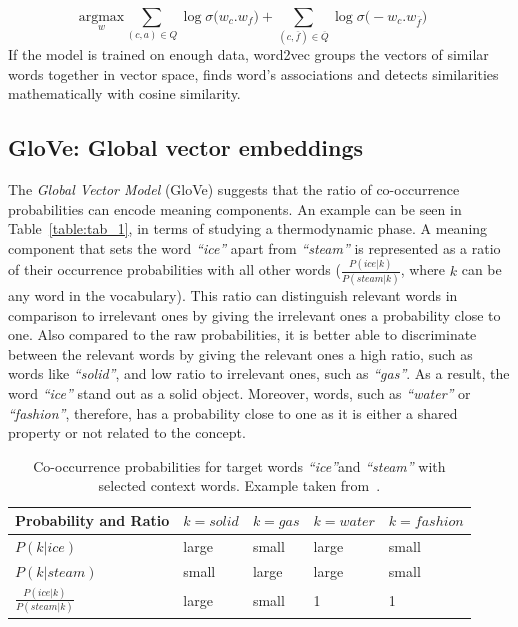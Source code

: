 \begin{equation}
\label{eq:w2v_negative}
\underset { w }{ \mathrm{ argmax } } \sum _{ (c,a)\in Q }^{  }{ \log { \sigma ( } w_{ c }.w_{ f }) } +\sum _{ (c,\overline {f})\in \overline { Q }  }^{  }{ \log { \sigma ( } -w_{ c }.w_{ \overline {f} })\quad  } 
\end{equation}
If the model is trained on enough data, word2vec groups the vectors of similar words together in vector space, finds word’s associations and detects similarities mathematically with cosine similarity. 
\subsection{GloVe: Global vector embeddings}
\label{subsec:GloVe}
The \emph{Global Vector Model} (GloVe) suggests that the ratio of co-occurrence probabilities can encode meaning components. An example can be seen in Table~\ref{table:tab_1}, in terms of studying a thermodynamic phase. A meaning component that sets the word \emph{``ice''} apart from \emph{``steam''} is represented as a ratio of their occurrence probabilities with all other words \big($\frac { P(ice|k) }{ P(steam|k) } $, where $k$ can be any word in the vocabulary\big). This ratio can distinguish relevant words in comparison to irrelevant ones by giving the irrelevant ones a probability close to one. Also compared to the raw probabilities, it is better able to discriminate between the relevant words by giving the relevant ones a high ratio, such as words like \emph{``solid''}, and low ratio to irrelevant ones, such as \emph{``gas''}. As a result, the word \emph{``ice''} stand out as a solid object. Moreover, words, such as \emph{``water''} or \emph{``fashion''}, therefore, has a probability close to one as it is either a shared property or not related to the concept.\\
\label{table:tab_1}
\begin{table}[]
\centering
\caption{Co-occurrence probabilities for target words \emph{``ice''}and \emph{``steam''} with selected context words. Example taken from~.}
\label{eq:log_prob}
\begin{tabular}{@{}l|l|l|l|l@{}}
\toprule
Probability and Ratio &  $k=solid$& $k=gas$ & $k=water$ &$k= fashion$  \\ \midrule $P(k|ice)$& {\color[HTML]{CB0000}large} &  {\color[HTML]{329A9D}small} & {\color[HTML]{CB0000}large} & {\color[HTML]{329A9D}small} \\\midrule
  $P(k|steam)$&{\color[HTML]{329A9D}small}  & {\color[HTML]{CB0000}large} &  {\color[HTML]{CB0000}large}&{\color[HTML]{329A9D}small}  \\\midrule
 $\frac { P(ice|k) }{ P(steam|k) } $& {\color[HTML]{CB0000}large} &  {\color[HTML]{329A9D}small}&  1 &    1  \\\midrule
\end{tabular}%
\end{table}
